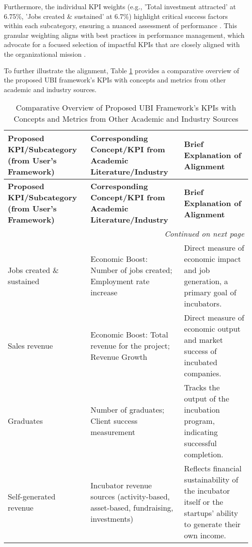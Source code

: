 \documentclass[../Main.tex]{subfiles}
\begin{document}
Furthermore, the individual KPI weights (e.g., 'Total investment attracted' at 6.75\%, 'Jobs created \& sustained' at 6.7\%) highlight critical success factors within each subcategory, ensuring a nuanced assessment of performance \cite{ubi2019world,ubi2021world}. This granular weighting aligns with best practices in performance management, which advocate for a focused selection of impactful KPIs that are closely aligned with the organizational mission \cite{InsideHigherEd_2023_BestPractices}.


To further illustrate the alignment, Table \ref{tab:kpis_alignment} provides a comparative overview of the proposed UBI framework's KPIs with concepts and metrics from other academic and industry sources.

\setlength{\LTcapwidth}{\textwidth}
\begin{longtable}{|p{}|p{}|p{}|}
    \caption{Comparative Overview of Proposed UBI Framework's KPIs with Concepts and Metrics from Other Academic and Industry Sources}\label{tab:kpis_alignment} \\
    \hline
    \textbf{Proposed KPI/Subcategory (from User's Framework)} & \textbf{Corresponding Concept/KPI from Academic Literature/Industry} & \textbf{Brief Explanation of Alignment} \\
    \hline
    \endfirsthead
    \hline
    \textbf{Proposed KPI/Subcategory (from User's Framework)} & \textbf{Corresponding Concept/KPI from Academic Literature/Industry} & \textbf{Brief Explanation of Alignment} \\
    \hline
    \endhead
    \hline
    \multicolumn{3}{r}{\textit{Continued on next page}} \\
    \endfoot
    \hline
    \endlastfoot
    Jobs created \& sustained & Economic Boost: Number of jobs created; Employment rate increase & Direct measure of economic impact and job generation, a primary goal of incubators. \\
    \hline
    Sales revenue & Economic Boost: Total revenue for the project; Revenue Growth & Direct measure of economic output and market success of incubated companies. \\
    \hline
    Graduates & Number of graduates; Client success measurement & Tracks the output of the incubation program, indicating successful completion. \\
    \hline
    Self-generated revenue & Incubator revenue sources (activity-based, asset-based, fundraising, investments) & Reflects financial sustainability of the incubator itself or the startups' ability to generate their own income. \\

\end{longtable}
\end{document}
